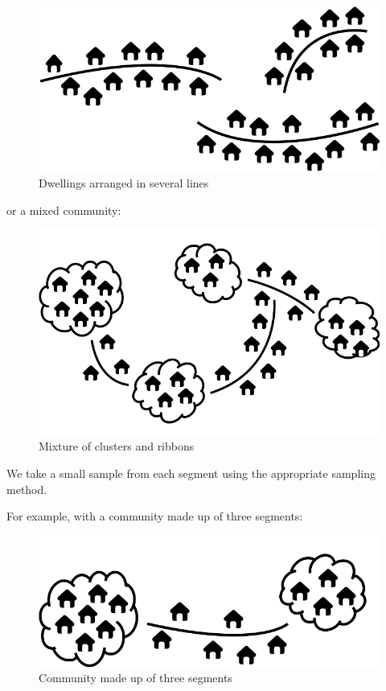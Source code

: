 \documentclass[12pt,a4paper]{book}
\theoremstyle{definition}
\theoremstyle{definition}
\theoremstyle{definition}
\theoremstyle{remark}
\begin{document}
\begin{figure}[H]

{\centering \includegraphics{figures/stage2sample4} 

}

\caption{Dwellings arranged in several lines}\label{fig:sample18}
\end{figure}

or a mixed community:

\begin{figure}[H]

{\centering \includegraphics{figures/stage2sample5} 

}

\caption{Mixture of clusters and ribbons}\label{fig:sample19}
\end{figure}

We take a small sample from each segment using the appropriate sampling
method.

For example, with a community made up of three segments:

\begin{figure}[H]

{\centering \includegraphics{figures/stage2sample6} 

}

\caption{Community made up of three segments}\label{fig:sample20}
\end{figure}
\end{document}
